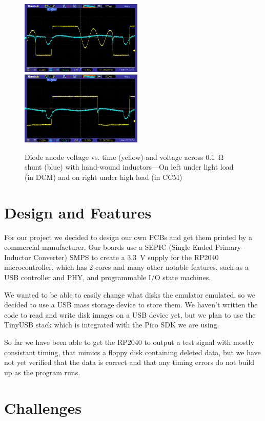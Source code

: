 \documentclass[a4paper]{article}
\begin{document}
\begin{figure}
  \centering
  \includegraphics[height=3.5cm]{pic_25_1}\hfill\includegraphics[height=3.5cm]{pic_25_4}
  \caption[Voltage and current traces with handwound inductors]{Diode
    anode voltage vs. time (yellow) and voltage across \qty{0.1}{\ohm}
    shunt (blue) with hand-wound inductors---On left under light load (in
    DCM) and on right under high load (in CCM)}
\end{figure}

\section {Design and Features}

For our project we decided to design our own PCBs and get them printed
by a commercial manufacturer. Our boards use a SEPIC (Single-Ended
Primary-Inductor Converter) SMPS to create a \qty{3.3}{\V} supply for
the RP2040 microcontroller, which has 2 cores and many other notable
features, such as a USB controller and PHY, and programmable I/O state
machines.

We wanted to be able to easily change what disks the emulator
emulated, so we decided to use a USB mass storage device to store
them. We haven't written the code to read and write disk images on a
USB device yet, but we plan to use the TinyUSB stack which is
integrated with the Pico SDK we are using.

So far we have been able to get the RP2040 to output a test signal
with mostly consistant timing, that mimics a floppy disk containing
deleted data, but we have not yet verified that the data is correct
and that any timing errors do not build up as the program runs.

\section{Challenges}
\end{document}

